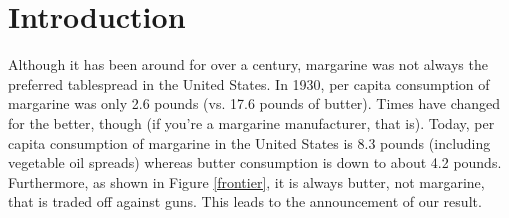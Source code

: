 \documentclass[opre,nonblindrev]{informs3}
\begin{document}
\maketitle

%


\section{Introduction}

Although it has been around for over a century, margarine was not
always the preferred tablespread in the United States. In 1930, per
capita consumption of margarine was only 2.6 pounds (vs. 17.6 pounds
of butter). Times have changed for the better, though (if you're a
margarine manufacturer, that is). Today, per capita consumption of
margarine in the United States is 8.3 pounds (including vegetable
oil spreads) whereas butter consumption is down to about 4.2 pounds.
Furthermore, as shown in Figure \ref{frontier}, it is always butter,
not margarine, that is traded off against guns. This leads to the announcement of our  result.
\end{document}
